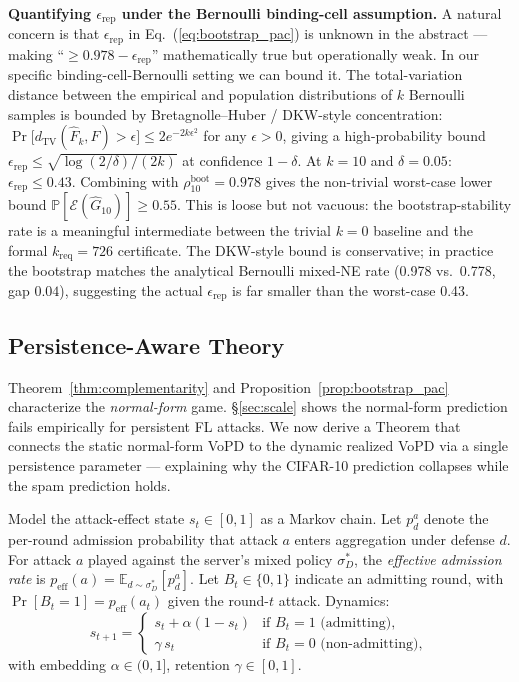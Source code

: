 \documentclass{article}
\begin{document}
\textbf{Quantifying $\epsilon_{\mathrm{rep}}$ under the Bernoulli binding-cell assumption.} A natural concern is that $\epsilon_{\mathrm{rep}}$ in Eq.~(\ref{eq:bootstrap_pac}) is unknown in the abstract --- making ``$\geq 0.978 - \epsilon_{\mathrm{rep}}$'' mathematically true but operationally weak. In our specific binding-cell-Bernoulli setting we can bound it. The total-variation distance between the empirical and population distributions of $k$ Bernoulli samples is bounded by Bretagnolle--Huber / DKW-style concentration: $\Pr\bigl[d_{\mathrm{TV}}(\hat F_k, F) > \epsilon\bigr] \leq 2 e^{-2 k \epsilon^2}$ for any $\epsilon > 0$, giving a high-probability bound $\epsilon_{\mathrm{rep}} \leq \sqrt{\log(2/\delta)/(2k)}$ at confidence $1-\delta$. At $k=10$ and $\delta=0.05$: $\epsilon_{\mathrm{rep}} \leq 0.43$. Combining with $\rho_{10}^{\mathrm{boot}} = 0.978$ gives the non-trivial worst-case lower bound $\mathbb{P}[\mathcal{E}(\hat G_{10})] \geq 0.55$. This is loose but not vacuous: the bootstrap-stability rate is a meaningful intermediate between the trivial $k=0$ baseline and the formal $k_{\mathrm{req}}=726$ certificate. The DKW-style bound is conservative; in practice the bootstrap matches the analytical Bernoulli mixed-NE rate (0.978 vs.\ 0.778, gap $0.04$), suggesting the actual $\epsilon_{\mathrm{rep}}$ is far smaller than the worst-case 0.43.

\subsection{Persistence-Aware Theory}
\label{sec:persistence}

Theorem~\ref{thm:complementarity} and Proposition~\ref{prop:bootstrap_pac} characterize the \emph{normal-form} game. §\ref{sec:scale} shows the normal-form prediction fails empirically for persistent FL attacks. We now derive a Theorem that connects the static normal-form VoPD to the dynamic realized VoPD via a single persistence parameter --- explaining why the CIFAR-10 prediction collapses while the spam prediction holds.

Model the attack-effect state $s_t \in [0,1]$ as a Markov chain. Let $p_d^a$ denote the per-round admission probability that attack $a$ enters aggregation under defense $d$. For attack $a$ played against the server's mixed policy $\sigma_D^*$, the \emph{effective admission rate} is $p_{\mathrm{eff}}(a) = \mathbb{E}_{d \sim \sigma_D^*}[p_d^a]$. Let $B_t \in \{0,1\}$ indicate an admitting round, with $\Pr[B_t = 1] = p_{\mathrm{eff}}(a_t)$ given the round-$t$ attack. Dynamics:
\begin{equation}
s_{t+1} = \begin{cases} s_t + \alpha(1 - s_t) & \text{if } B_t = 1 \text{ (admitting)}, \\ \gamma \, s_t & \text{if } B_t = 0 \text{ (non-admitting)}, \end{cases}
\label{eq:persistence_dynamics}
\end{equation}
with embedding $\alpha \in (0,1]$, retention $\gamma \in [0,1]$.
\end{document}
